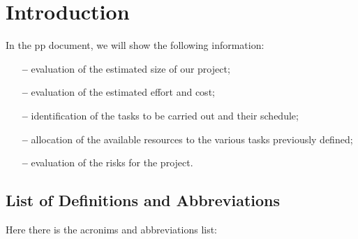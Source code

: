 \section{Introduction} \label{sec:intro}

In the \acl{pp} document, we will show the following information:

\begin{itemize}

\item[\textbf{--}]evaluation of the estimated size of our project;

\item[\textbf{--}]evaluation of the estimated effort and cost;

\item[\textbf{--}]identification of the tasks to be carried out and their schedule;

\item[\textbf{--}]allocation of the available resources to the various tasks previously defined;

\item[\textbf{--}]evaluation of the risks for the project.

\end{itemize}

\subsection{List of Definitions and Abbreviations}
Here there is the acronims and abbreviations list:

